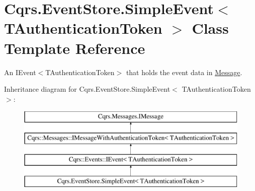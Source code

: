 \hypertarget{classCqrs_1_1EventStore_1_1SimpleEvent}{}\section{Cqrs.\+Event\+Store.\+Simple\+Event$<$ T\+Authentication\+Token $>$ Class Template Reference}
\label{classCqrs_1_1EventStore_1_1SimpleEvent}


An I\+Event$<$\+T\+Authentication\+Token$>$ that holds the event data in \hyperlink{classCqrs_1_1EventStore_1_1SimpleEvent_a4e07144de1cdb94bbbf1313eb0e1f35d_a4e07144de1cdb94bbbf1313eb0e1f35d}{Message}.  


Inheritance diagram for Cqrs.\+Event\+Store.\+Simple\+Event$<$ T\+Authentication\+Token $>$\+:\begin{figure}[H]
\begin{center}
\leavevmode
\includegraphics[height=4.000000cm]{classCqrs_1_1EventStore_1_1SimpleEvent}
\end{center}
\end{figure}
